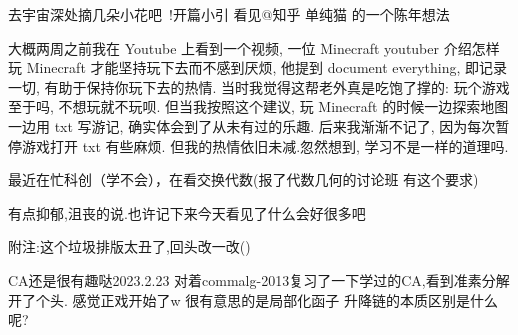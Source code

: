\begin{diary}{去宇宙深处摘几朵小花吧~!}{开篇小引}
看见@知乎 单纯猫 的一个陈年想法

大概两周之前我在 Youtube 上看到一个视频, 一位 Minecraft youtuber 介绍怎样玩 Minecraft 才能坚持玩下去而不感到厌烦, 他提到 document everything, 即记录一切, 有助于保持你玩下去的热情. 当时我觉得这帮老外真是吃饱了撑的: 玩个游戏至于吗, 不想玩就不玩呗. 但当我按照这个建议, 玩 Minecraft 的时候一边探索地图一边用 txt 写游记, 确实体会到了从未有过的乐趣. 后来我渐渐不记了, 因为每次暂停游戏打开 txt 有些麻烦. 但我的热情依旧未减.忽然想到, 学习不是一样的道理吗.

最近在忙科创（学不会），在看交换代数(报了代数几何的讨论班 有这个要求)

有点抑郁,沮丧的说.也许记下来今天看见了什么会好很多吧

附注:这个垃圾排版太丑了,回头改一改()
\end{diary}

\begin{diary}{CA还是很有趣哒}{2023.2.23}
对着commalg-2013复习了一下学过的CA,看到准素分解开了个头.
感觉正戏开始了w
很有意思的是局部化函子
升降链的本质区别是什么呢?
\end{diary}
